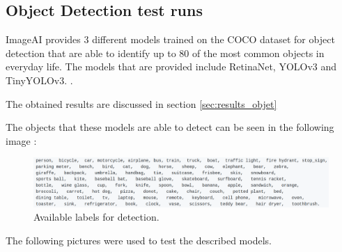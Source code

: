 
  \subsection{Object Detection test runs}
  \label{sec:object_test}

  \par ImageAI provides 3 different models trained on the COCO dataset for object detection that are able to identify up to 80 of the most common objects in everyday life. The models that are provided include RetinaNet, YOLOv3 and TinyYOLOv3. \cite{ImageAI}.

  \par The obtained results are discussed in section \ref{sec:results_objet}


  The objects that these models are able to detect can be seen in the following image : 





    \begin{figure}[htb]
      \centering
      \includegraphics[width = \textwidth]{Sections/4InitialWork/4_images_random/detections.png}
      \caption{Available labels for detection. }
      \label{fig:yolov3} 
  \end{figure}


The following pictures were used to test the described models.


